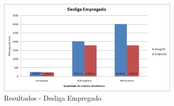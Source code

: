 \begin{figure}[!htbp]
	\begin{center}
		\includegraphics[width=0.8\textwidth]{resultados/desliga_empregado}
	\end{center}
	\caption{Resultados - Desliga Empregado}
	\label{fig:resultdesliga_empregado}
\end{figure}


